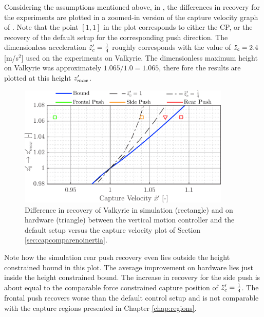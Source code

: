 Considering the assumptions mentioned above, in , the differences in recovery for the experiments are plotted in a zoomed-in version of the capture velocity graph of . Note that the point $[1,1]$ in the plot corresponds to either the \ac{CP}, or the recovery of the default setup for the corresponding push direction. The dimensionless acceleration $\ddot{z}_{c}'=\frac{1}{4}$ roughly corresponds with the value of $\ddot{z}_{c}=2.4$ [m/s$^2$] used on the experiments on Valkyrie. The dimensionless maximum height on Valkyrie was approximately $1.065/1.0=1.065$, there fore the results are plotted at this height $z_{max}'$.
\begin{figure}
\centering
\includegraphics[width=0.9\textwidth]{STYLESTUFF/regioncomparison.png}
\caption{Difference in recovery of Valkyrie in simulation (rectangle) and on hardware (triangle) between the vertical motion controller and the default setup versus the capture velocity plot of Section \ref{sec:capcomparenoinertia}.}
\label{fig:regioncomparison}
\end{figure}

Note how the simulation rear push recovery even lies outside the height constrained bound in this plot. The average improvement on hardware lies just inside the height constrained bound. The increase in recovery for the side push is about equal to the comparable force constrained capture position of $\ddot{z}_{c}'=\frac{1}{4}$. The frontal push recovers worse than the default control setup and is not comparable with the capture regions presented in Chapter \ref{chap:regions}.

